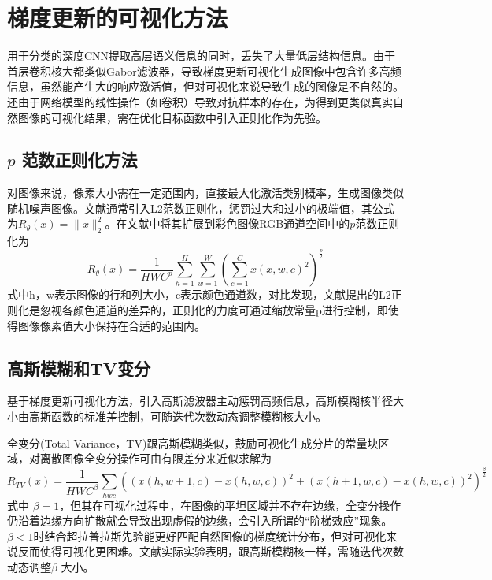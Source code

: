 \section{梯度更新的可视化方法}
 
用于分类的深度CNN提取高层语义信息的同时，丢失了大量低层结构信息。由于首层卷积核大都类似Gabor滤波器，导致梯度更新可视化生成图像中包含许多高频信息，虽然能产生大的响应激活值，但对可视化来说导致生成的图像是不自然的。还由于网络模型的线性操作（如卷积）导致对抗样本\citep{Goodfellow2014}的存在，为得到更类似真实自然图像的可视化结果，需在优化目标函数中引入正则化作为先验。
\subsection{$p$ 范数正则化方法} 

对图像来说，像素大小需在一定范围内，直接最大化激活类别概率，生成图像类似随机噪声图像。文献通常引入L2范数正则化，惩罚过大和过小的极端值，其公式为$R_{\theta}(x)=\parallel x \parallel _{2}^{2}$。在文献\citep{Mahendran2015}中将其扩展到彩色图像RGB通道空间中的$p$范数正则化为
\begin{equation} \label{eq:ch04_05}
       R_{\theta}(x)= \frac{1}{HWC^p}\sum_{h=1}^{H}\sum_{w=1}^{W}(\sum_{c=1}^{C}x(x,w,c)^2)^{\frac{p}{2}}
\end{equation}
式中h，w表示图像的行和列大小，c表示颜色通道数，对比发现，文献提出的L2正则化是忽视各颜色通道的差异的，正则化的力度可通过缩放常量p进行控制，即使得图像像素值大小保持在合适的范围内。
\subsection{高斯模糊和TV变分}

基于梯度更新可视化方法，引入高斯滤波器主动惩罚高频信息\citep{JasonYosinski2015}，高斯模糊核半径大小由高斯函数的标准差控制，可随迭代次数动态调整模糊核大小。

全变分\citep{Mahendran2015}(Total Variance，TV)跟高斯模糊类似，鼓励可视化生成分片的常量块区域，对离散图像全变分操作可由有限差分来近似求解为    \begin{equation} \label{eq:ch04_06}
       R_{TV}(x)= \frac{1}{HWC^\beta}\sum _{hwc}((x(h,w+1,c)-x(h,w,c))^2+(x(h+1,w,c)-x(h,w,c))^2)^{\frac{\beta}{2}}
\end{equation}
式中 $\beta =1$，但其在可视化过程中，在图像的平坦区域并不存在边缘，全变分操作仍沿着边缘方向扩散就会导致出现虚假的边缘，会引入所谓的“阶梯效应”现象。$\beta<1$时结合超拉普拉斯先验\citep{Krishnan2009}能更好匹配自然图像的梯度统计分布，但对可视化来说反而使得可视化更困难。文献实际实验表明，跟高斯模糊核一样，需随迭代次数动态调整$\beta$ 大小。
